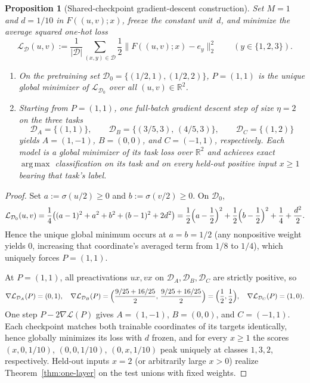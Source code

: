 \documentclass[11pt]{article}
\theoremstyle{plain}
\newtheorem{proposition}[theorem]{Proposition}
\theoremstyle{definition}
\theoremstyle{remark}
\DeclareMathOperator{\argmax}{arg\,max}
\begin{document}
\begin{proposition}[Shared-checkpoint gradient-descent construction]\label{prop:gd}
Set $M = 1$ and $d = 1/10$ in $F((u, v); x)$, freeze the constant unit~$d$, and minimize the average squared one-hot loss
\[
\mathcal{L}_{\mathcal{D}}(u, v) := \frac{1}{|\mathcal{D}|} \sum_{(x, y) \in \mathcal{D}} \frac{1}{2}\bigl\|F((u, v); x) - e_y\bigr\|_2^2 \qquad (y \in \{1, 2, 3\}).
\]
\begin{enumerate}[label=\textup{(\arabic*)},nosep]
\item On the pretraining set $\mathcal{D}_0 = \{(1/2, 1), (1/2, 2)\}$, $P = (1, 1)$ is the unique global minimizer of $\mathcal{L}_{\mathcal{D}_0}$ over all $(u, v) \in \mathbb{R}^2$.
\item Starting from $P = (1, 1)$, one full-batch gradient descent step of size $\eta = 2$ on the three tasks
\[
\mathcal{D}_A = \{(1, 1)\}, \qquad
\mathcal{D}_B = \bigl\{(3/5, 3),\, (4/5, 3)\bigr\}, \qquad
\mathcal{D}_C = \{(1, 2)\}
\]
yields $A = (1, -1)$, $B = (0, 0)$, and $C = (-1, 1)$, respectively. Each model is a global minimizer of its task loss over $\mathbb{R}^2$ and achieves exact $\argmax$ classification on its task and on every held-out positive input $x \ge 1$ bearing that task's label.
\end{enumerate}
\end{proposition}

\begin{proof}
Set $a := \sigma(u/2) \ge 0$ and $b := \sigma(v/2) \ge 0$. On $\mathcal{D}_0$,
\[
\mathcal{L}_{\mathcal{D}_0}(u, v)
= \frac{1}{4}\bigl((a - 1)^2 + a^2 + b^2 + (b - 1)^2 + 2d^2\bigr)
= \frac{1}{2}\Bigl(a - \frac{1}{2}\Bigr)^2 + \frac{1}{2}\Bigl(b - \frac{1}{2}\Bigr)^2 + \frac{1}{4} + \frac{d^2}{2}.
\]
Hence the unique global minimum occurs at $a = b = 1/2$ (any nonpositive weight yields $0$, increasing that coordinate's averaged term from $1/8$ to $1/4$), which uniquely forces $P = (1, 1)$.

At $P = (1, 1)$, all preactivations $ux, vx$ on $\mathcal{D}_A, \mathcal{D}_B, \mathcal{D}_C$ are strictly positive, so
\[
\nabla\mathcal{L}_{\mathcal{D}_A}(P) = (0, 1), \quad
\nabla\mathcal{L}_{\mathcal{D}_B}(P) = \Bigl(\frac{9/25 + 16/25}{2},\, \frac{9/25 + 16/25}{2}\Bigr) = \Bigl(\frac{1}{2}, \frac{1}{2}\Bigr), \quad
\nabla\mathcal{L}_{\mathcal{D}_C}(P) = (1, 0).
\]
One step $P - 2\nabla\mathcal{L}(P)$ gives $A = (1, -1)$, $B = (0, 0)$, and $C = (-1, 1)$. Each checkpoint matches both trainable coordinates of its targets identically, hence globally minimizes its loss with $d$ frozen, and for every $x \ge 1$ the scores $(x, 0, 1/10)$, $(0, 0, 1/10)$, $(0, x, 1/10)$ peak uniquely at classes $1, 3, 2$, respectively. Held-out inputs $x = 2$ (or arbitrarily large $x > 0$) realize Theorem~\ref{thm:one-layer} on the test unions with fixed weights.
\end{proof}
\end{document}
